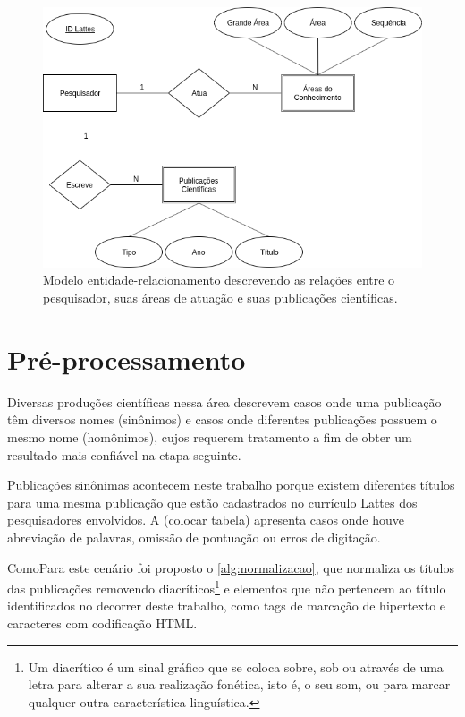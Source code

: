 \begin{figure}[htpb]
  \centering
  \includegraphics[scale=.5]{figuras/diagrama-er}
  \caption{Modelo entidade-relacionamento descrevendo as relações entre o pesquisador, suas áreas de atuação e suas publicações científicas.}
  \label{fig:er}
\end{figure}

\section{Pré-processamento}

Diversas produções científicas nessa área \cite{franceschet2011collaboration} \cite{mena2013prospecccao} \cite{reuther2006managing} descrevem casos onde uma publicação têm diversos nomes (sinônimos) e casos onde diferentes publicações possuem o mesmo nome (homônimos), cujos requerem tratamento a fim de obter um resultado mais confiável na etapa seguinte.

Publicações sinônimas acontecem neste trabalho porque existem diferentes títulos para uma mesma publicação que estão cadastrados no currículo Lattes dos pesquisadores envolvidos. A (colocar tabela) apresenta casos onde houve abreviação de palavras, omissão de pontuação ou erros de digitação.

ComoPara este cenário foi proposto o \autoref{alg:normalizacao}, que normaliza os títulos das publicações removendo diacríticos\footnote{Um diacrítico é um sinal gráfico que se coloca sobre, sob ou através de uma letra para alterar a sua realização fonética, isto é, o seu som, ou para marcar qualquer outra característica linguística.} e elementos que não pertencem ao título identificados no decorrer deste trabalho, como tags de marcação de hipertexto e caracteres com codificação HTML.

